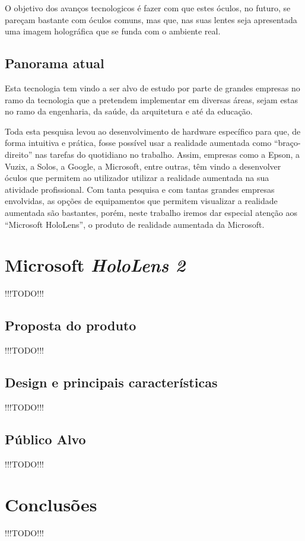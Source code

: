 \documentclass{report}
\begin{document}
O objetivo dos avanços tecnologicos é fazer com que estes óculos, no futuro, se pareçam bastante com óculos comuns, mas que, nas suas lentes seja apresentada uma
imagem holográfica que se funda com o ambiente real.

\section{Panorama atual}
Esta tecnologia tem vindo a ser alvo de estudo por parte de grandes empresas no ramo da tecnologia que a pretendem implementar em diversas áreas, sejam estas no ramo da engenharia, da saúde, da arquitetura e até da educação.

Toda esta pesquisa levou ao desenvolvimento de hardware específico para que, de forma intuitiva e prática, fosse possível usar a realidade aumentada como “braço-direito” nas tarefas do quotidiano no trabalho. Assim, empresas como a Epson, a Vuzix, a Solos, a Google, a Microsoft, entre outras, têm vindo a desenvolver óculos que permitem ao utilizador utilizar a realidade aumentada na sua atividade profissional. Com tanta pesquisa e com tantas grandes empresas envolvidas, as opções de equipamentos que permitem visualizar a realidade aumentada são bastantes, porém, neste trabalho iremos dar especial atenção aos “Microsoft HoloLens”, o produto de realidade aumentada da Microsoft.

\chapter{Microsoft \textit{HoloLens 2}}
\label{chap.microsoft-hololens-2}
!!!TODO!!!

\section{Proposta do produto}
!!!TODO!!!

\section{Design e principais características}
!!!TODO!!!

\section{Público Alvo}
!!!TODO!!!

\chapter{Conclusões}
\label{chap.conclusao}
!!!TODO!!!
\end{document}
